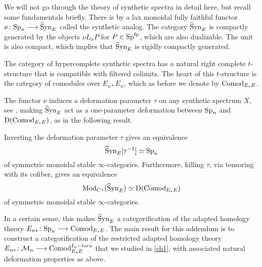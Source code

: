 We will not go through the theory of synthetic spectra in detail here, but recall some fundamentals briefly. There is by \cite[4.4, 4.38]{pstragowski_2022} a lax monoidal fully faithful functor $\nu\colon\mathrm{Sp}_n \longrightarrow \widehat{\mathrm{S}}\mathrm{yn}_{E}$ called the synthetic analog. The category $\widehat{\mathrm{S}}\mathrm{yn}_{E}$ is compactly generated by the objects $\nu L_n P$ for $P\in \mathrm{Sp}^{\mathrm{fp}}$, which are also dualizable. The unit is also compact, which implies that $\widehat{\mathrm{S}}\mathrm{yn}_{E}$ is rigidly compactly generated. 

The category of hypercomplete synthetic spectra has a natural right complete $t$-structure that is compatible with filtered colimits. The heart of this $t$-structure is the category of comodules over $E_{n*}E_n$, which as before we denote by $\mathrm{Comod}_{E_*E}$. 

The functor $\nu$ induces a deformation parameter $\tau$ on any synthetic spectrum $X$, see \cite[Section 4.3]{pstragowski_2022}, making $\widehat{\mathrm{S}}\mathrm{yn}_{E}$ act as a one-parameter deformation between $\mathrm{Sp}_n$ and $\mathrm{D}(\mathrm{Comod}_{E_*E})$, as in the following result. 

\begin{theorem}
    \label{ch3:add:thm:deformation-properties-of-syn}
    Inverting the deformation parameter $\tau$ gives an equivalence 
    \[\widehat{\mathrm{S}}\mathrm{yn}_{E}[\tau^{-1}]\simeq \mathrm{Sp}_n\]
    of symmetric monoidal stable $\infty$-categories. Furthermore, killing $\tau$, via tensoring with its cofiber, gives an equivalence 
    \[\mathrm{Mod}_{C\tau}(\widehat{\mathrm{S}}\mathrm{yn}_{E})\simeq \mathrm{D}(\mathrm{Comod}_{E_*E})\]
    of symmetric monoidal stable $\infty$-categories. 
\end{theorem}

In a certain sense, this makes $\widehat{\mathrm{S}}\mathrm{yn}_{E}$ a categorification of the adapted homology theory $E_{n*}\colon \mathrm{Sp}_n\longrightarrow \mathrm{Comod}_{E_*E}$. The main result for this addendum is to construct a categorification of the restricted adapted homology theory $E_{n*}\colon \mathcal{M}_{n} \longrightarrow \mathrm{Comod}_{E_*E}^{I_n-tors}$ that we studied in \cref{ch1}, with associated natural deformation properties as above. 



